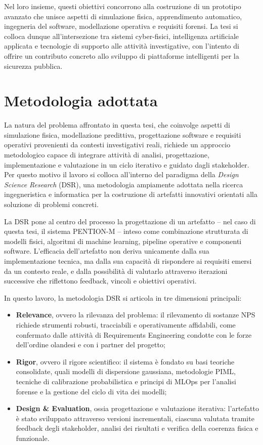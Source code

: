 Nel loro insieme, questi obiettivi concorrono alla costruzione di un prototipo avanzato che unisce aspetti di simulazione fisica, apprendimento automatico, ingegneria del software, modellazione operativa e requisiti forensi.
La tesi si colloca dunque all'intersezione tra sistemi cyber-fisici, intelligenza artificiale applicata e tecnologie di supporto alle attività investigative, con l'intento di offrire un contributo concreto allo sviluppo di piattaforme intelligenti per la sicurezza pubblica.

\section{Metodologia adottata}

La natura del problema affrontato in questa tesi, che coinvolge aspetti di simulazione fisica, modellazione predittiva, progettazione software e requisiti operativi provenienti da contesti investigativi reali, richiede un approccio metodologico capace di integrare attività di analisi, progettazione, implementazione e valutazione in un ciclo iterativo e guidato dagli stakeholder.
Per questo motivo il lavoro si colloca all'interno del paradigma della \textit{Design Science Research} (DSR), una metodologia ampiamente adottata nella ricerca ingegneristica e informatica per la costruzione di artefatti innovativi orientati alla soluzione di problemi concreti.

La DSR pone al centro del processo la progettazione di un artefatto -- nel caso di questa tesi, il sistema \textsc{PENTION-M} -- inteso come combinazione strutturata di modelli fisici, algoritmi di machine learning, pipeline operative e componenti software.
L'efficacia dell’artefatto non deriva unicamente dalla sua implementazione tecnica, ma dalla sua capacità di rispondere ai requisiti emersi da un contesto reale, e dalla possibilità di valutarlo attraverso iterazioni successive che riflettono feedback, vincoli e obiettivi operativi.

In questo lavoro, la metodologia DSR si articola in tre dimensioni principali:

\begin{itemize}
	\item \textbf{Relevance}, ovvero la rilevanza del problema: il rilevamento di sostanze NPS richiede strumenti robusti, tracciabili e operativamente affidabili, come confermato dalle attività di Requirements Engineering condotte con le forze dell’ordine olandesi e con i partner del progetto;
	\item \textbf{Rigor}, ovvero il rigore scientifico: il sistema è fondato su basi teoriche consolidate, quali modelli di dispersione gaussiana, metodologie PIML, tecniche di calibrazione probabilistica e principi di MLOps per l’analisi forense e la gestione del ciclo di vita dei modelli;
	\item \textbf{Design \& Evaluation}, ossia progettazione e valutazione iterativa: l’artefatto è stato sviluppato attraverso versioni incrementali, ciascuna valutata tramite feedback degli stakeholder, analisi dei risultati e verifica della coerenza fisica e funzionale.
\end{itemize}

